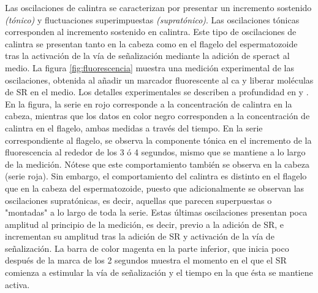 Las oscilaciones de \ac{calintra} se caracterizan por presentar un incremento sostenido \emph{(tónico)} y fluctuaciones superimpuestas \emph{(supratónico)}. Las oscilaciones tónicas corresponden al incremento sostenido en \ac{calintra}. Este tipo de oscilaciones de \ac{calintra} se presentan tanto en la cabeza como en el flagelo del espermatozoide tras la activación de la vía de señalización mediante la adición de speract al medio. La figura \ref{fig:fluorescencia} muestra una medición experimental de las oscilaciones, obtenida al añadir un marcador fluorescente al \ac{ca} y liberar moléculas de \ac{SR} en el medio. Los detalles experimentales se describen a profundidad en \citeauthor{Darszon2008} \citep{Darszon2008} y \citeauthor{Wood2007} \citep{Wood2007}. En la figura, la serie en rojo corresponde a la concentración de \ac{calintra} en la cabeza, mientras que los datos en color negro corresponden a la concentración de \ac{calintra} en el flagelo, ambas medidas a través del tiempo. En la serie correspondiente al flagelo, se observa la componente tónica en el incremento de la fluorescencia al rededor de los 3 ó 4 segundos, mismo que se mantiene a lo largo de la medición. Nótese que este comportamiento también se observa en la cabeza (serie roja). Sin embargo, el comportamiento del \ac{calintra} es distinto en el flagelo que en la cabeza del espermatozoide, puesto que adicionalmente se observan las oscilaciones supratónicas, es decir, aquellas que parecen superpuestas o "montadas" a lo largo de toda la serie. Estas últimas oscilaciones presentan poca amplitud al principio de la medición, es decir, previo a la adición de \ac{SR}, e incrementan su amplitud tras la adición de \ac{SR} y activación de la vía de señalización. La barra de color magenta en la parte inferior, que inicia poco después de la marca de los 2 segundos muestra el momento en el que el \ac{SR} comienza a estimular la vía de señalización y el tiempo en la que ésta se mantiene activa.


